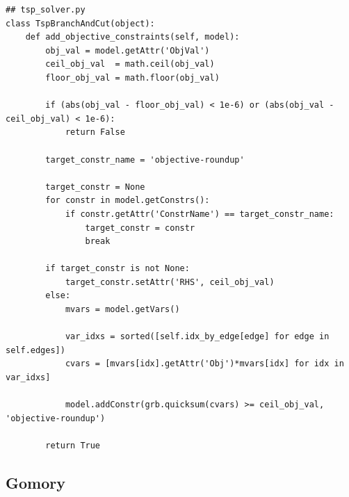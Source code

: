 \documentclass{article}
\begin{document}
\begin{flushleft}
\begin{lstlisting}
## tsp_solver.py
class TspBranchAndCut(object):
    def add_objective_constraints(self, model):
        obj_val = model.getAttr('ObjVal')
        ceil_obj_val  = math.ceil(obj_val)
        floor_obj_val = math.floor(obj_val)

        if (abs(obj_val - floor_obj_val) < 1e-6) or (abs(obj_val - ceil_obj_val) < 1e-6):
            return False

        target_constr_name = 'objective-roundup'

        target_constr = None
        for constr in model.getConstrs():
            if constr.getAttr('ConstrName') == target_constr_name:
                target_constr = constr
                break

        if target_constr is not None:
            target_constr.setAttr('RHS', ceil_obj_val)
        else:
            mvars = model.getVars()

            var_idxs = sorted([self.idx_by_edge[edge] for edge in self.edges])
            cvars = [mvars[idx].getAttr('Obj')*mvars[idx] for idx in var_idxs]

            model.addConstr(grb.quicksum(cvars) >= ceil_obj_val, 'objective-roundup')

        return True
\end{lstlisting}

\begin{flushleft}

\end{flushleft}

\subsection{Gomory}
\begin{flushleft}

\end{flushleft}

\end{flushleft}
\end{document}

